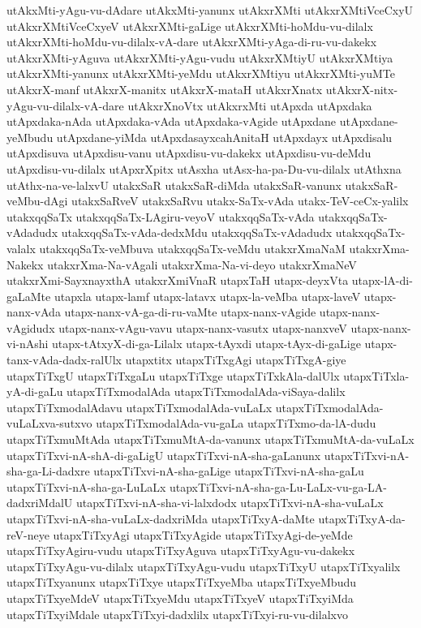 {utAkxMti-yAgu-vu-dAdare
utAkxMti-yanunx
utAkxrXMti
utAkxrXMtiVceCxyU
utAkxrXMtiVceCxyeV
utAkxrXMti-gaLige
utAkxrXMti-hoMdu-vu-dilalx
utAkxrXMti-hoMdu-vu-dilalx-vA-dare
utAkxrXMti-yAga-di-ru-vu-dakekx
utAkxrXMti-yAguva
utAkxrXMti-yAgu-vudu
utAkxrXMtiyU
utAkxrXMtiya
utAkxrXMti-yanunx
utAkxrXMti-yeMdu
utAkxrXMtiyu
utAkxrXMti-yuMTe
utAkxrX-manf
utAkxrX-manitx
utAkxrX-mataH
utAkxrXnatx
utAkxrX-nitx-yAgu-vu-dilalx-vA-dare
utAkxrXnoVtx
utAkxrxMti
utApxda
utApxdaka
utApxdaka-nAda
utApxdaka-vAda
utApxdaka-vAgide
utApxdane
utApxdane-yeMbudu
utApxdane-yiMda
utApxdasayxcahAnitaH
utApxdayx
utApxdisalu
utApxdisuva
utApxdisu-vanu
utApxdisu-vu-dakekx
utApxdisu-vu-deMdu
utApxdisu-vu-dilalx
utApxrXpitx
utAsxha
utAsx-ha-pa-Du-vu-dilalx
utAthxna
utAthx-na-ve-lalxvU
utakxSaR
utakxSaR-diMda
utakxSaR-vanunx
utakxSaR-veMbu-dAgi
utakxSaRveV
utakxSaRvu
utakx-SaTx-vAda
utakx-TeV-ceCx-yalilx
utakxqqSaTx
utakxqqSaTx-LAgiru-veyoV
utakxqqSaTx-vAda
utakxqqSaTx-vAdadudx
utakxqqSaTx-vAda-dedxMdu
utakxqqSaTx-vAdadudx
utakxqqSaTx-valalx
utakxqqSaTx-veMbuva
utakxqqSaTx-veMdu
utakxrXmaNaM
utakxrXma-Nakekx
utakxrXma-Na-vAgali
utakxrXma-Na-vi-deyo
utakxrXmaNeV
utakxrXmi-SayxnayxthA
utakxrXmiVnaR
utapxTaH
utapx-deyxVta
utapx-lA-di-gaLaMte
utapxla
utapx-lamf
utapx-latavx
utapx-la-veMba
utapx-laveV
utapx-nanx-vAda
utapx-nanx-vA-ga-di-ru-vaMte
utapx-nanx-vAgide
utapx-nanx-vAgidudx
utapx-nanx-vAgu-vavu
utapx-nanx-vasutx
utapx-nanxveV
utapx-nanx-vi-nAshi
utapx-tAtxyX-di-ga-Lilalx
utapx-tAyxdi
utapx-tAyx-di-gaLige
utapx-tanx-vAda-dadx-ralUlx
utapxtitx
utapxTiTxgAgi
utapxTiTxgA-giye
utapxTiTxgU
utapxTiTxgaLu
utapxTiTxge
utapxTiTxkAla-dalUlx
utapxTiTxla-yA-di-gaLu
utapxTiTxmodalAda
utapxTiTxmodalAda-viSaya-dalilx
utapxTiTxmodalAdavu
utapxTiTxmodalAda-vuLaLx
utapxTiTxmodalAda-vuLaLxva-sutxvo
utapxTiTxmodalAda-vu-gaLa
utapxTiTxmo-da-lA-dudu
utapxTiTxmuMtAda
utapxTiTxmuMtA-da-vanunx
utapxTiTxmuMtA-da-vuLaLx
utapxTiTxvi-nA-shA-di-gaLigU
utapxTiTxvi-nA-sha-gaLanunx
utapxTiTxvi-nA-sha-ga-Li-dadxre
utapxTiTxvi-nA-sha-gaLige
utapxTiTxvi-nA-sha-gaLu
utapxTiTxvi-nA-sha-ga-LuLaLx
utapxTiTxvi-nA-sha-ga-Lu-LaLx-vu-ga-LA-dadxriMdalU
utapxTiTxvi-nA-sha-vi-lalxdodx
utapxTiTxvi-nA-sha-vuLaLx
utapxTiTxvi-nA-sha-vuLaLx-dadxriMda
utapxTiTxyA-daMte
utapxTiTxyA-da-reV-neye
utapxTiTxyAgi
utapxTiTxyAgide
utapxTiTxyAgi-de-yeMde
utapxTiTxyAgiru-vudu
utapxTiTxyAguva
utapxTiTxyAgu-vu-dakekx
utapxTiTxyAgu-vu-dilalx
utapxTiTxyAgu-vudu
utapxTiTxyU
utapxTiTxyalilx
utapxTiTxyanunx
utapxTiTxye
utapxTiTxyeMba
utapxTiTxyeMbudu
utapxTiTxyeMdeV
utapxTiTxyeMdu
utapxTiTxyeV
utapxTiTxyiMda
utapxTiTxyiMdale
utapxTiTxyi-dadxlilx
utapxTiTxyi-ru-vu-dilalxvo
}
